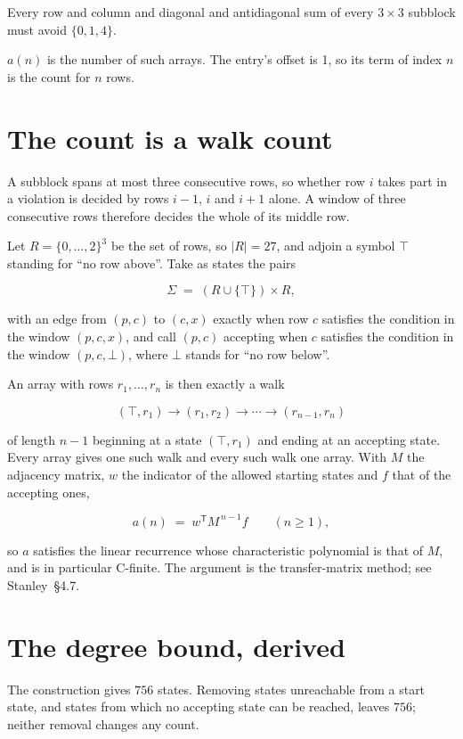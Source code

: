 \documentclass[11pt]{article}
\theoremstyle{definition}
\begin{document}
Every row and column and diagonal and antidiagonal sum of every $3\times3$ subblock must avoid $\{0, 1, 4\}$.

$a(n)$ is the number of such arrays. The entry's offset is 1, so its term of index $n$ is the count for $n$ rows.

\section{The count is a walk count}

A subblock spans at most three consecutive rows, so whether row $i$ takes part in a violation is decided by rows $i-1$, $i$ and $i+1$ alone. A window of three consecutive rows therefore decides the whole of its middle row.

Let $R = \{0,\dots,2\}^{3}$ be the set of rows, so $|R| = 27$, and adjoin a symbol $\top$ standing for ``no row above''. Take as states the pairs

\[\Sigma \;=\; (R \cup \{\top\}) \times R,\]

with an edge from $(p,c)$ to $(c,x)$ exactly when row $c$ satisfies the condition in the window $(p,c,x)$, and call $(p,c)$ accepting when $c$ satisfies the condition in the window $(p,c,\bot)$, where $\bot$ stands for ``no row below''.

An array with rows $r_1,\dots,r_n$ is then exactly a walk

\[(\top,r_1) \to (r_1,r_2) \to \cdots \to (r_{n-1},r_n)\]

of length $n-1$ beginning at a state $(\top,r_1)$ and ending at an accepting state. Every array gives one such walk and every such walk one array. With $M$ the adjacency matrix, $w$ the indicator of the allowed starting states and $f$ that of the accepting ones,

\[a(n) \;=\; w^{\mathsf T} M^{\,n-1} f \qquad (n \ge 1),\]

so $a$ satisfies the linear recurrence whose characteristic polynomial is that of $M$, and is in particular C-finite. The argument is the transfer-matrix method; see Stanley~\S4.7.

\section{The degree bound, derived}

The construction gives $756$ states. Removing states unreachable from a start state, and states from which no accepting state can be reached, leaves $756$; neither removal changes any count.
\end{document}
